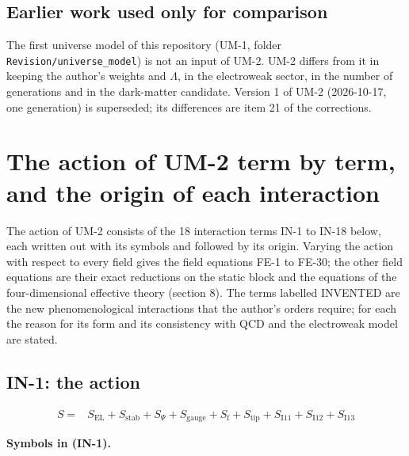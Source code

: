 \documentclass[
  10pt,
]{article}
\begin{document}
\hypertarget{earlier-work-used-only-for-comparison}{%
\subsection{Earlier work used only for
comparison}\label{earlier-work-used-only-for-comparison}}

The first universe model of this repository (UM-1, folder
\texttt{Revision/universe\_model}) is not an input of UM-2. UM-2 differs
from it in keeping the author's weights and \(\Lambda\), in the
electroweak sector, in the number of generations and in the dark-matter
candidate. Version 1 of UM-2 (2026-10-17, one generation) is superseded;
its differences are item 21 of the corrections.

\hypertarget{the-action-of-um-2-term-by-term-and-the-origin-of-each-interaction}{%
\section{The action of UM-2 term by term, and the origin of each
interaction}\label{the-action-of-um-2-term-by-term-and-the-origin-of-each-interaction}}

The action of UM-2 consists of the 18 interaction terms IN-1 to IN-18
below, each written out with its symbols and followed by its origin.
Varying the action with respect to every field gives the field equations
FE-1 to FE-30; the other field equations are their exact reductions on
the static block and the equations of the four-dimensional effective
theory (section 8). The terms labelled INVENTED are the new
phenomenological interactions that the author's orders require; for each
the reason for its form and its consistency with QCD and the electroweak
model are stated.

\hypertarget{in-1-the-action}{%
\subsection{IN-1: the action}\label{in-1-the-action}}

\[
\begin{aligned}
S ={}& S_{\mathrm{EL}} + S_{\mathrm{stab}} + S_\Psi + S_{\mathrm{gauge}} + S_{\mathrm{f}} + S_{\mathrm{tip}}
 + S_{\mathrm{I11}} + S_{\mathrm{I12}} + S_{\mathrm{I13}}
\end{aligned} \tag{IN-1}
\]

\textbf{Symbols in (IN-1).}
\end{document}
